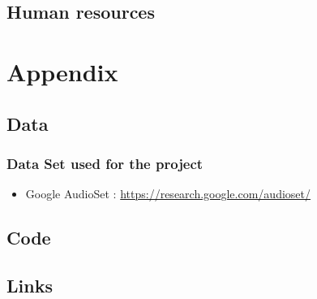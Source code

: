 \documentclass[11pt]{article}
\begin{document}
\subsection{Human resources}

\pagebreak

\section{Appendix}

\subsection{Data}

\subsubsection*{Data Set used for the project}

\begin{itemize}
  \item Google AudioSet : \url{https://research.google.com/audioset/}
  \label{item:google-audioset}
  
\end{itemize}



\subsection{Code}

\subsection{Links}

\pagebreak



\end{document}
